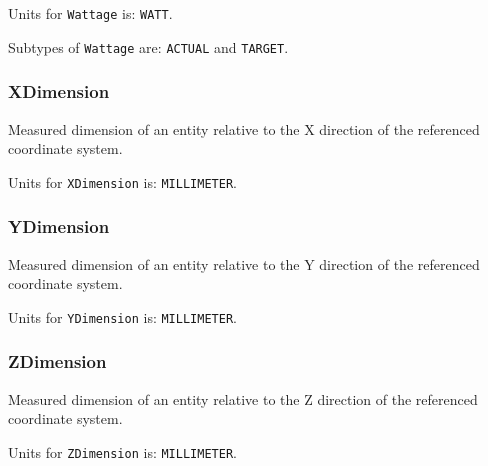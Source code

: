 Units for \texttt{Wattage} is: \texttt{WATT}.


Subtypes of \texttt{Wattage} are: \texttt{ACTUAL} and \texttt{TARGET}. 
\FloatBarrier

\subsubsection{XDimension}
  \label{sec:XDimension}



Measured dimension of an entity relative to the X direction of the referenced coordinate system.


Units for \texttt{XDimension} is: \texttt{MILLIMETER}.

\FloatBarrier

\subsubsection{YDimension}
  \label{sec:YDimension}



Measured dimension of an entity relative to the Y direction of the referenced coordinate system.


Units for \texttt{YDimension} is: \texttt{MILLIMETER}.

\FloatBarrier

\subsubsection{ZDimension}
  \label{sec:ZDimension}



Measured dimension of an entity relative to the Z direction of the referenced coordinate system.


Units for \texttt{ZDimension} is: \texttt{MILLIMETER}.

\FloatBarrier
